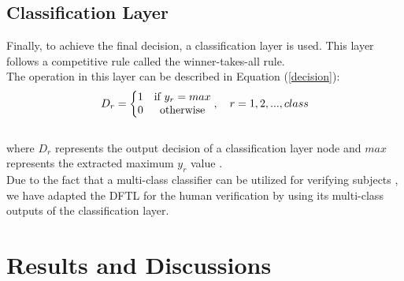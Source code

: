 \documentclass[conference]{IEEEtran}
\begin{document}
\subsection{Classification Layer}
Finally, to achieve the final decision, a classification layer is used. This layer follows a competitive rule called the winner-takes-all rule. \\
The operation in this layer can be described in Equation (\ref{decision}): \\
\begin{equation}
D_{r}=\left\{\begin{matrix}
1 & $if$~y_{r}=max \\ 
0 &  $otherwise$
\end{matrix}\right.
,~~~r=1,2,...,class
\label{decision}
\end{equation}\\
where $D_{r}$ represents the output decision of a classification layer node and $max$ represents the extracted maximum $y_{r}$ value \cite{Al-Nima2017Signal}.\\
Due to the fact that a multi-class classifier can be utilized for verifying subjects \cite{Al-Nima2015Human} \cite{Al-Nima2017finger}, we have adapted the DFTL for the human verification by using its multi-class outputs of the classification layer.

\section{Results and Discussions}
\end{document}
